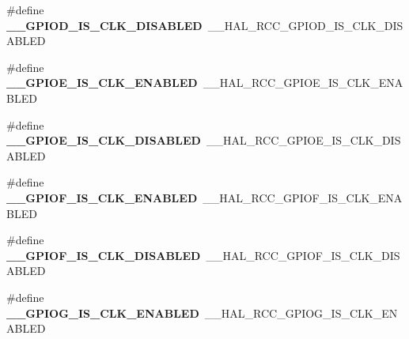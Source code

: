\begin{DoxyCompactItemize}
\item 
\hypertarget{group___h_a_l___r_c_c___aliased_gaf263202e283c076a7ec5befba3668bc1}{\#define {\bfseries \-\_\-\-\_\-\-G\-P\-I\-O\-D\-\_\-\-I\-S\-\_\-\-C\-L\-K\-\_\-\-D\-I\-S\-A\-B\-L\-E\-D}~\-\_\-\-\_\-\-H\-A\-L\-\_\-\-R\-C\-C\-\_\-\-G\-P\-I\-O\-D\-\_\-\-I\-S\-\_\-\-C\-L\-K\-\_\-\-D\-I\-S\-A\-B\-L\-E\-D}\label{group___h_a_l___r_c_c___aliased_gaf263202e283c076a7ec5befba3668bc1}

\item 
\hypertarget{group___h_a_l___r_c_c___aliased_ga93b12611227bb65b0cf39d2f8e4bfee8}{\#define {\bfseries \-\_\-\-\_\-\-G\-P\-I\-O\-E\-\_\-\-I\-S\-\_\-\-C\-L\-K\-\_\-\-E\-N\-A\-B\-L\-E\-D}~\-\_\-\-\_\-\-H\-A\-L\-\_\-\-R\-C\-C\-\_\-\-G\-P\-I\-O\-E\-\_\-\-I\-S\-\_\-\-C\-L\-K\-\_\-\-E\-N\-A\-B\-L\-E\-D}\label{group___h_a_l___r_c_c___aliased_ga93b12611227bb65b0cf39d2f8e4bfee8}

\item 
\hypertarget{group___h_a_l___r_c_c___aliased_gac941a0daf1c5b83cca995df7099c19a2}{\#define {\bfseries \-\_\-\-\_\-\-G\-P\-I\-O\-E\-\_\-\-I\-S\-\_\-\-C\-L\-K\-\_\-\-D\-I\-S\-A\-B\-L\-E\-D}~\-\_\-\-\_\-\-H\-A\-L\-\_\-\-R\-C\-C\-\_\-\-G\-P\-I\-O\-E\-\_\-\-I\-S\-\_\-\-C\-L\-K\-\_\-\-D\-I\-S\-A\-B\-L\-E\-D}\label{group___h_a_l___r_c_c___aliased_gac941a0daf1c5b83cca995df7099c19a2}

\item 
\hypertarget{group___h_a_l___r_c_c___aliased_ga67876589bb01694e6817533ed88a16ff}{\#define {\bfseries \-\_\-\-\_\-\-G\-P\-I\-O\-F\-\_\-\-I\-S\-\_\-\-C\-L\-K\-\_\-\-E\-N\-A\-B\-L\-E\-D}~\-\_\-\-\_\-\-H\-A\-L\-\_\-\-R\-C\-C\-\_\-\-G\-P\-I\-O\-F\-\_\-\-I\-S\-\_\-\-C\-L\-K\-\_\-\-E\-N\-A\-B\-L\-E\-D}\label{group___h_a_l___r_c_c___aliased_ga67876589bb01694e6817533ed88a16ff}

\item 
\hypertarget{group___h_a_l___r_c_c___aliased_gac51cb23651c45bb726d6f5cc73e110d7}{\#define {\bfseries \-\_\-\-\_\-\-G\-P\-I\-O\-F\-\_\-\-I\-S\-\_\-\-C\-L\-K\-\_\-\-D\-I\-S\-A\-B\-L\-E\-D}~\-\_\-\-\_\-\-H\-A\-L\-\_\-\-R\-C\-C\-\_\-\-G\-P\-I\-O\-F\-\_\-\-I\-S\-\_\-\-C\-L\-K\-\_\-\-D\-I\-S\-A\-B\-L\-E\-D}\label{group___h_a_l___r_c_c___aliased_gac51cb23651c45bb726d6f5cc73e110d7}

\item 
\hypertarget{group___h_a_l___r_c_c___aliased_ga0ddda8d7d817c15069062563b279db04}{\#define {\bfseries \-\_\-\-\_\-\-G\-P\-I\-O\-G\-\_\-\-I\-S\-\_\-\-C\-L\-K\-\_\-\-E\-N\-A\-B\-L\-E\-D}~\-\_\-\-\_\-\-H\-A\-L\-\_\-\-R\-C\-C\-\_\-\-G\-P\-I\-O\-G\-\_\-\-I\-S\-\_\-\-C\-L\-K\-\_\-\-E\-N\-A\-B\-L\-E\-D}\label{group___h_a_l___r_c_c___aliased_ga0ddda8d7d817c15069062563b279db04}


\end{DoxyCompactItemize}
